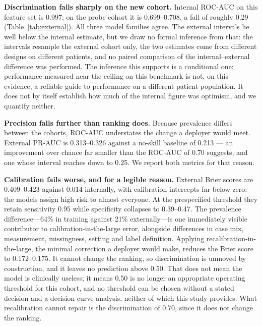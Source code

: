 \documentclass[conference]{IEEEtran}
\begin{document}


\textbf{Discrimination falls sharply on the new cohort.} Internal ROC-AUC on
this feature set is 0.997; on the probe cohort it is 0.699--0.708, a fall of
roughly 0.29 (Table~\ref{tab:external}). All three model families agree. The
external intervals lie well below the internal estimate, but we draw no
formal inference from that: the intervals resample the external cohort only,
the two estimates come from different designs on different patients, and no
paired comparison of the internal--external difference was performed. The
inference this supports is a conditional one: performance measured near the
ceiling on this benchmark is not, on this evidence, a reliable guide to
performance on a different patient population. It does not by itself
establish how much of the internal figure was optimism, and we quantify
neither.

\textbf{Precision falls further than ranking does.} Because prevalence
differs between the cohorts, ROC-AUC understates the change a deployer would
meet. External PR-AUC is 0.313--0.326 against a no-skill baseline of 0.213
--- an improvement over chance far smaller than the ROC-AUC of 0.70 suggests,
and one whose interval reaches down to 0.25. We report both metrics for that
reason.

\textbf{Calibration fails worse, and for a legible reason.} External Brier
scores are 0.409--0.423 against 0.014 internally, with calibration intercepts
far below zero: the models assign high risk to almost everyone. At the
prespecified threshold they retain sensitivity 0.95 while specificity
collapses to 0.39--0.47. The prevalence difference---64\% in training
against 21\% externally---is one immediately visible contributor to
calibration-in-the-large error, alongside differences in case mix,
measurement, missingness, setting and label definition. Applying recalibration-in-the-large, the minimal
correction a deployer would make, reduces the Brier score to 0.172--0.175. It
cannot change the ranking, so discrimination is unmoved by construction, and
it leaves no prediction above 0.50. That does not mean the model is
clinically useless; it means 0.50 is no longer an appropriate operating
threshold for this cohort, and no threshold can be chosen without a
stated decision and a decision-curve analysis, neither of which this
study provides. What recalibration cannot repair is the discrimination
of 0.70, since it does not change the ranking.
\end{document}
